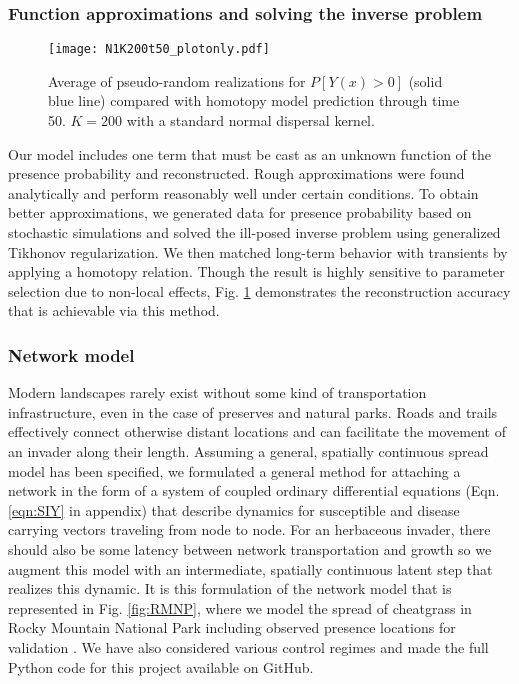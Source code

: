 \documentclass[11pt]{article}
\begin{document}
\subsubsection{Function approximations and solving the inverse problem}

\begin{figure}[b]
\vspace{-10pt}
\begin{center}
\texttt{[image: N1K200t50\_plotonly.pdf]}
\caption{Average of pseudo-random realizations for $P[Y(x)>0]$ (solid blue line) compared with homotopy model prediction through time 50. $K=200$ with a standard normal dispersal kernel.}
\label{fig:homotopy}
\end{center}
\vspace{-20pt}
\end{figure}

Our model includes one term that must be cast as an unknown function of the presence probability and reconstructed. Rough approximations were found analytically and perform reasonably well under certain conditions. To obtain better approximations, we generated data for presence probability based on stochastic simulations and solved the ill-posed inverse problem using generalized Tikhonov regularization. We then matched long-term behavior with transients by applying a homotopy relation. Though the result is highly sensitive to parameter selection due to non-local effects, Fig. \ref{fig:homotopy} demonstrates the reconstruction accuracy that is achievable via this method.

\subsubsection{Network model}

Modern landscapes rarely exist without some kind of transportation infrastructure, even in the case of preserves and natural parks. Roads and trails effectively connect otherwise distant locations and can facilitate the movement of an invader along their length. Assuming a general, spatially continuous spread model has been specified, we formulated a general method for attaching a network in the form of a system of coupled ordinary differential equations (Eqn. \ref{eqn:SIY} in appendix) that describe dynamics for susceptible and disease carrying vectors traveling from node to node. For an herbaceous invader, there should also be some latency between network transportation and growth so we augment this model with an intermediate, spatially continuous latent step that realizes this dynamic. It is this formulation of the network model that is represented in Fig. \ref{fig:RMNP}, where we model the spread of cheatgrass in Rocky Mountain National Park including observed presence locations for validation \cite{Strickland15}. We have also considered various control regimes and made the full Python code for this project available on GitHub.
\end{document}
